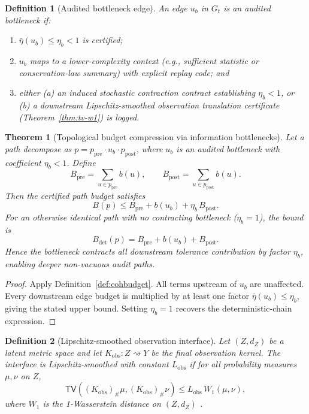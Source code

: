 \documentclass[11pt,a4paper]{article}
\newtheorem{theorem}{Theorem}[section]
\newtheorem{definition}{Definition}[section]
\newcommand{\TV}{\mathsf{TV}}
\begin{document}
\begin{definition}[Audited bottleneck edge]
An edge $u_b$ in $G_t$ is an \emph{audited bottleneck} if:
\begin{enumerate}[leftmargin=*]
\item $\bar\eta(u_b)\le \eta_b<1$ is certified;
\item $u_b$ maps to a lower-complexity context (e.g., sufficient statistic or conservation-law summary) with explicit replay code; and
\item either (a) an induced stochastic contraction contract establishing $\eta_b<1$, or (b) a downstream Lipschitz-smoothed observation translation certificate (Theorem~\ref{thm:tv-w1}) is logged.
\end{enumerate}
\end{definition}

\begin{theorem}[Topological budget compression via information bottlenecks]
\label{thm:bottleneck}
Let a path decompose as $p=p_{\mathrm{pre}}\cdot u_b\cdot p_{\mathrm{post}}$, where $u_b$ is an audited bottleneck with coefficient $\eta_b<1$.
Define
\[
B_{\mathrm{pre}}=\sum_{u\in p_{\mathrm{pre}}}b(u),
\qquad
B_{\mathrm{post}}=\sum_{u\in p_{\mathrm{post}}}b(u).
\]
Then the certified path budget satisfies
\[
B(p)\le B_{\mathrm{pre}}+b(u_b)+\eta_b\,B_{\mathrm{post}}.
\]
For an otherwise identical path with no contracting bottleneck ($\eta_b=1$), the bound is
\[
B_{\mathrm{det}}(p)=B_{\mathrm{pre}}+b(u_b)+B_{\mathrm{post}}.
\]
Hence the bottleneck contracts all downstream tolerance contribution by factor $\eta_b$, enabling deeper non-vacuous audit paths.
\end{theorem}
\begin{proof}
Apply Definition~\ref{def:cohbudget}.
All terms upstream of $u_b$ are unaffected.
Every downstream edge budget is multiplied by at least one factor $\bar\eta(u_b)\le\eta_b$, giving the stated upper bound.
Setting $\eta_b=1$ recovers the deterministic-chain expression.
\end{proof}

\begin{definition}[Lipschitz-smoothed observation interface]
Let $(Z,d_Z)$ be a latent metric space and let $K_{\mathrm{obs}}:Z\rightsquigarrow Y$ be the final observation kernel.
The interface is \emph{Lipschitz-smoothed} with constant $L_{\mathrm{obs}}$ if for all probability measures $\mu,\nu$ on $Z$,
\[
\TV\!\left((K_{\mathrm{obs}})_\#\mu,(K_{\mathrm{obs}})_\#\nu\right)\le L_{\mathrm{obs}}\,W_1(\mu,\nu),
\]
where $W_1$ is the 1-Wasserstein distance on $(Z,d_Z)$ \citep[see][for foundations]{Villani2009OT}.
\end{definition}
\end{document}
